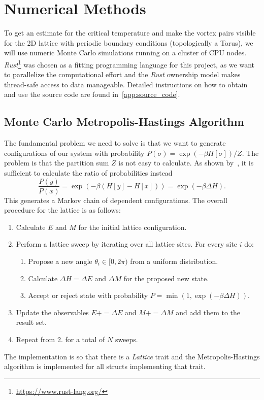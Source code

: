 \section{Numerical Methods}
To get an estimate for the critical temperature and make the vortex pairs visible for the 2D lattice with periodic boundary conditions (topologically a Torus), we will use numeric Monte Carlo simulations running on a cluster of CPU nodes. \emph{Rust}\footnote{\url{https://www.rust-lang.org/}} was chosen as a fitting programming language for this project, as we want to parallelize the computational effort and the \emph{Rust} ownership model makes thread-safe access to data manageable. Detailed instructions on how to obtain and use the source code are found in~\cref{app:source_code}.

\subsection{Monte Carlo Metropolis-Hastings Algorithm}\label{sec:metropolis_hastings}
The fundamental problem we need to solve is that we want to generate configurations of our system with probability $P(\sigma) = \exp{(-\beta H[\sigma])}/Z$. The problem is that the partition sum $Z$ is not easy to calculate. As shown by~\citet{metropolis}, it is sufficient to calculate the ratio of probabilities instead
\begin{equation}
	\frac{P(y)}{P(x)} = \exp{(-\beta(H[y] - H[x]))} = \exp{(-\beta \Delta H)}.
\end{equation}
This generates a Markov chain of dependent configurations. The overall procedure for the lattice is as follows:
\begin{enumerate}
	\item Calculate $E$ and $M$ for the initial lattice configuration.
	\item Perform a lattice sweep by iterating over all lattice sites. For every site $i$ do:
	\begin{enumerate}
		\item Propose a new angle $\theta_i \in [0,2\pi)$ from a uniform distribution.
		\item Calculate $\Delta H = \Delta E$ and $\Delta M$ for the proposed new state.
		\item Accept or reject state with probability $P = \min{(1, \exp{(-\beta\Delta H)})}$.
	\end{enumerate}
	\item Update the observables $E \mathrel{{+}{=}} \Delta E$ and $M \mathrel{{+}{=}} \Delta M$ and add them to the result set.
	\item Repeat from 2. for a total of $N$ sweeps.
\end{enumerate}
The implementation is so that there is a \textit{Lattice} trait and the Metropolis-Hastings algorithm is implemented for all structs implementing that trait.

